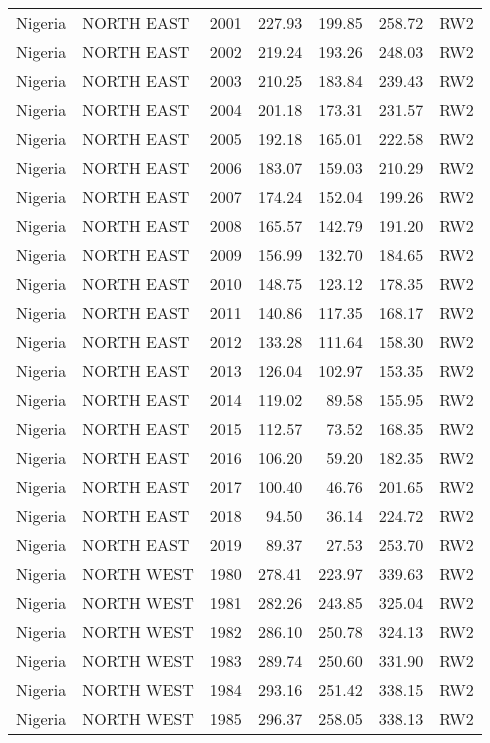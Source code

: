 \begin{longtable}{lllrrrl}
  Nigeria & NORTH EAST & 2001 & 227.93 & 199.85 & 258.72 & RW2 \\ 
  Nigeria & NORTH EAST & 2002 & 219.24 & 193.26 & 248.03 & RW2 \\ 
  Nigeria & NORTH EAST & 2003 & 210.25 & 183.84 & 239.43 & RW2 \\ 
  Nigeria & NORTH EAST & 2004 & 201.18 & 173.31 & 231.57 & RW2 \\ 
  Nigeria & NORTH EAST & 2005 & 192.18 & 165.01 & 222.58 & RW2 \\ 
  Nigeria & NORTH EAST & 2006 & 183.07 & 159.03 & 210.29 & RW2 \\ 
  Nigeria & NORTH EAST & 2007 & 174.24 & 152.04 & 199.26 & RW2 \\ 
  Nigeria & NORTH EAST & 2008 & 165.57 & 142.79 & 191.20 & RW2 \\ 
  Nigeria & NORTH EAST & 2009 & 156.99 & 132.70 & 184.65 & RW2 \\ 
  Nigeria & NORTH EAST & 2010 & 148.75 & 123.12 & 178.35 & RW2 \\ 
  Nigeria & NORTH EAST & 2011 & 140.86 & 117.35 & 168.17 & RW2 \\ 
  Nigeria & NORTH EAST & 2012 & 133.28 & 111.64 & 158.30 & RW2 \\ 
  Nigeria & NORTH EAST & 2013 & 126.04 & 102.97 & 153.35 & RW2 \\ 
  Nigeria & NORTH EAST & 2014 & 119.02 & 89.58 & 155.95 & RW2 \\ 
  Nigeria & NORTH EAST & 2015 & 112.57 & 73.52 & 168.35 & RW2 \\ 
  Nigeria & NORTH EAST & 2016 & 106.20 & 59.20 & 182.35 & RW2 \\ 
  Nigeria & NORTH EAST & 2017 & 100.40 & 46.76 & 201.65 & RW2 \\ 
  Nigeria & NORTH EAST & 2018 & 94.50 & 36.14 & 224.72 & RW2 \\ 
  Nigeria & NORTH EAST & 2019 & 89.37 & 27.53 & 253.70 & RW2 \\ 
  Nigeria & NORTH WEST & 1980 & 278.41 & 223.97 & 339.63 & RW2 \\ 
  Nigeria & NORTH WEST & 1981 & 282.26 & 243.85 & 325.04 & RW2 \\ 
  Nigeria & NORTH WEST & 1982 & 286.10 & 250.78 & 324.13 & RW2 \\ 
  Nigeria & NORTH WEST & 1983 & 289.74 & 250.60 & 331.90 & RW2 \\ 
  Nigeria & NORTH WEST & 1984 & 293.16 & 251.42 & 338.15 & RW2 \\ 
  Nigeria & NORTH WEST & 1985 & 296.37 & 258.05 & 338.13 & RW2 \\ 

\end{longtable}
